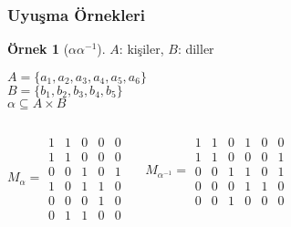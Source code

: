 \documentclass[dvipsnames]{beamer}
\theoremstyle{definition}
\theoremstyle{example}
\newtheorem{ornek}[theorem]{Örnek}
\theoremstyle{plain}
\begin{document}
\begin{frame}
  \frametitle{Uyuşma Örnekleri}

  \begin{ornek}[$\alpha \alpha^{-1}$]
    $A$: kişiler, $B$: diller

    \medskip
    $A=\{a_1,a_2,a_3,a_4,a_5,a_6\}$\\
    $B=\{b_1,b_2,b_3,b_4,b_5\}$\\
    $\alpha \subseteq A \times B$

    \pause
    \begin{columns}
      \[
        M_\alpha =
          \begin{array}{|ccccc|}
            1  &  1  &  0  &  0  &  0\\
            1  &  1  &  0  &  0  &  0\\
            0  &  0  &  1  &  0  &  1\\
            1  &  0  &  1  &  1  &  0\\
            0  &  0  &  0  &  1  &  0\\
            0  &  1  &  1  &  0  &  0
          \end{array}
      \]

      \[
        M_{\alpha^{-1}} =
          \begin{array}{|cccccc|}
            1  &  1  &  0  &  1  &  0  &  0\\
            1  &  1  &  0  &  0  &  0  &  1\\
            0  &  0  &  1  &  1  &  0  &  1\\
            0  &  0  &  0  &  1  &  1  &  0\\
            0  &  0  &  1  &  0  &  0  &  0
          \end{array}
      \]
    \end{columns}
  \end{ornek}
\end{frame}
\end{document}
